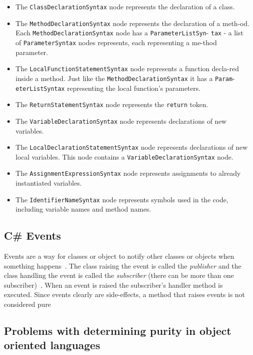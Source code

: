 \documentclass[a4paper,12pt]{article}
\begin{document}
\begin{itemize}
  \item The \texttt{ClassDeclarationSyntax} node represents the declaration of a class.
  \item The \texttt{MethodDeclarationSyntax} node represents the declaration of a meth-od. Each \texttt{MethodDeclarationSyntax} node has a \texttt{ParameterListSyn}- \texttt{tax} - a list of \texttt{ParameterSyntax} nodes represents, each representing a me-thod parameter.
  \item The \texttt{LocalFunctionStatementSyntax} node represents a function decla-red inside a method. Just like the \texttt{MethodDeclarationSyntax} it has a \texttt{Param}-\texttt{eterListSyntax} representing the local function's parameters.
  \item The \texttt{ReturnStatementSyntax} node represents the \texttt{return} token.
  \item The \texttt{VariableDeclarationSyntax} node represents declarations of new variables.
  \item The \texttt{LocalDeclarationStatementSyntax} node represents declarations of new local variables. This node contains a \texttt{VariableDeclarationSyntax} node.
  \item The \texttt{AssignmentExpressionSyntax} node represents assignments to already instantiated variables.
  \item The \texttt{IdentifierNameSyntax} node represents symbols used in the code, including variable names and method names.
\end{itemize}

\subsection{C\# Events} \label{sub:Events}
Events are a way for classes or object to notify other classes or objects when something happens~\cite{microsoft-events}. The class raising the event is called the \textit{publisher} and the class handling the event is called the \textit{subscriber} (there can be more than one subscriber)~\cite{microsoft-events}. When an event is raised the subscriber's handler method is executed. Since events clearly are side-effects, a method that raises events is not considered pure

\subsection{Problems with determining purity in object oriented languages} \label{sub:Problems with determining purity in object oriented languages}
\end{document}
